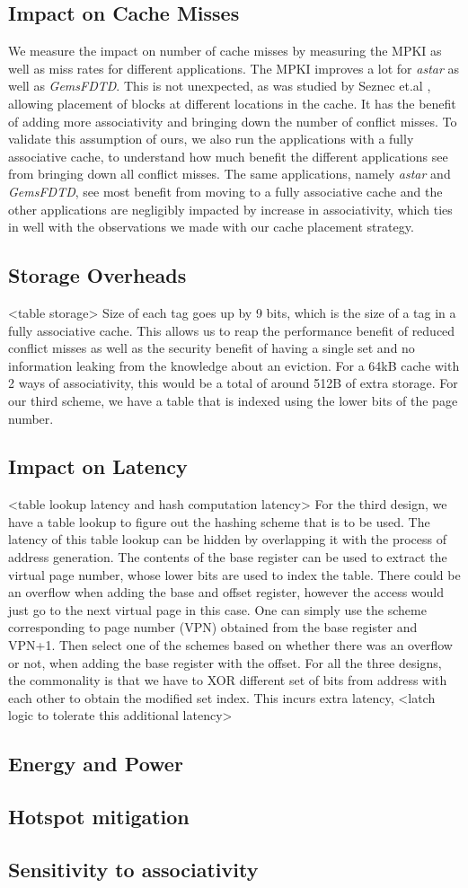 \subsection {Impact on Cache Misses}
We measure the impact on number of cache misses by measuring the MPKI as well as miss rates for different applications. The MPKI improves a lot for \textit{astar} as well as \textit{GemsFDTD}. This is not unexpected, as was studied by Seznec et.al \cite{skewed}, allowing placement of blocks at different locations in the cache. It has the benefit of adding more associativity and bringing down the number of conflict misses. To validate this assumption of ours, we also run the applications with a fully associative cache, to understand how much benefit the different applications see from bringing down all conflict misses. The same applications, namely \textit{astar} and \textit{GemsFDTD}, see most benefit from moving to a fully associative cache and the other applications are negligibly impacted by increase in associativity, which ties in well with the observations we made with our cache placement strategy.   
\subsection {Storage Overheads} <table storage>
Size of each tag goes up by 9 bits, which is the size of a tag in a fully associative cache. This allows us to reap the performance benefit of reduced conflict misses as well as the security benefit of having a single set and no information leaking from the knowledge about an eviction. For a 64kB cache with 2 ways of associativity, this would be a total of around 512B of extra storage.    
For our third scheme, we have a table that is indexed using the lower bits of the page number. 
\subsection {Impact on Latency} <table lookup latency and hash computation latency>
For the third design, we have a table lookup to figure out the hashing scheme that is to be used. The latency of this table lookup can be hidden by overlapping it with the process of address generation. The contents of the base register can be used to extract the virtual page number, whose lower bits are used to index the table. There could be an overflow when adding the base and offset register, however the access would just go to the next virtual page in this case. One can simply use the scheme corresponding to page number (VPN) obtained from the base register and VPN+1. Then select one of the schemes based on whether there was an overflow or not, when adding the base register with the offset.
For all the three designs, the commonality is that we have to XOR different set of bits from address with each other to obtain the modified set index. This incurs extra latency, <latch logic to tolerate this additional latency> 
\subsection {Energy and Power}
\subsection{Hotspot mitigation}
\subsection{Sensitivity to associativity}

